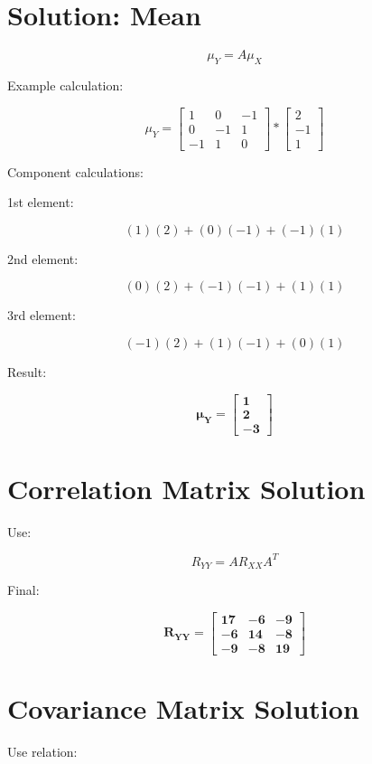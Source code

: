 \documentclass[12pt]{article}
\begin{document}
\section{Solution: Mean}

\[
\mu_Y = A\mu_X
\]

Example calculation:

\[
\mu_Y =
\begin{bmatrix}
1 & 0 & -1 \\
0 & -1 & 1 \\
-1 & 1 & 0
\end{bmatrix}
*
\begin{bmatrix}
2 \\ -1 \\ 1
\end{bmatrix}
\]

Component calculations:

1st element:

\[
(1)(2) + (0)(-1) + (-1)(1)
\]

2nd element:

\[
(0)(2) + (-1)(-1) + (1)(1)
\]

3rd element:

\[
(-1)(2) + (1)(-1) + (0)(1)
\]

Result:

\[
\boxed{\mathbf{
\mu_Y =
\begin{bmatrix}
1 \\ 2 \\ -3
\end{bmatrix}
}}
\]

\section{Correlation Matrix Solution}

Use:

\[
R_{YY} = AR_{XX}A^T
\]

Final:

\[
\boxed{\mathbf{
R_{YY} =
\begin{bmatrix}
17 & -6 & -9 \\
-6 & 14 & -8 \\
-9 & -8 & 19
\end{bmatrix}
}}
\]

\section{Covariance Matrix Solution}

Use relation:
\end{document}
